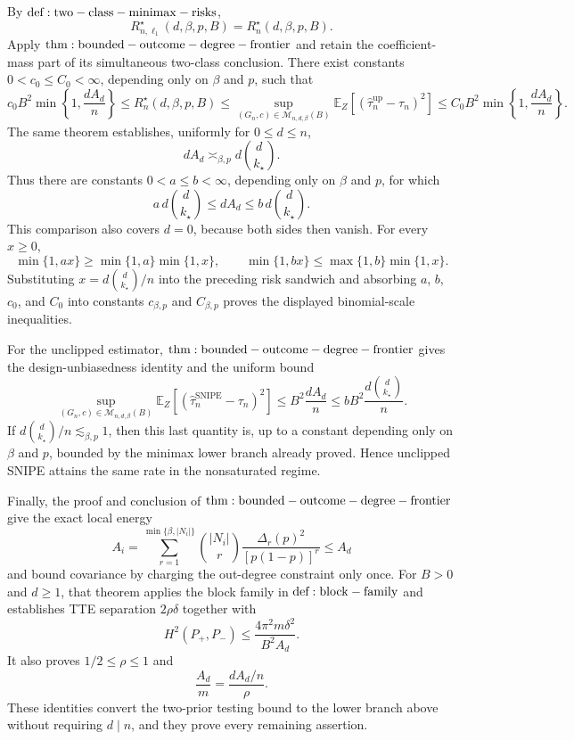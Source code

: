 By \({\rm def:two-class-minimax-risks}\),
\[
R_{n,\ell_1}^{\star}(d,\beta,p,B)=R_n^\star(d,\beta,p,B).
\]
Apply \({\rm thm:bounded-outcome-degree-frontier}\) and retain the coefficient-mass part of its simultaneous two-class conclusion. There exist constants \(0<c_0\le C_0<\infty\), depending only on \(\beta\) and \(p\), such that
\[
c_0B^2\min\!\left\{1,\frac{dA_d}{n}\right\}
\le R_n^\star(d,\beta,p,B)
\le \sup_{(G_n,c)\in\mathcal M_{n,d,\beta}(B)}
\mathbb E_Z\!\left[(\widehat\tau_n^{\mathrm{up}}-\tau_n)^2\right]
\le C_0B^2\min\!\left\{1,\frac{dA_d}{n}\right\}.
\]
The same theorem establishes, uniformly for \(0\le d\le n\),
\[
dA_d\asymp_{\beta,p}d\binom d{k_\star}.
\]
Thus there are constants \(0<a\le b<\infty\), depending only on \(\beta\) and \(p\), for which
\[
a\,d\binom d{k_\star}\le dA_d\le b\,d\binom d{k_\star}.
\]
This comparison also covers \(d=0\), because both sides then vanish. For every \(x\ge0\),
\[
\min\{1,ax\}\ge \min\{1,a\}\min\{1,x\},
\qquad
\min\{1,bx\}\le \max\{1,b\}\min\{1,x\}.
\]
Substituting \(x=d\binom d{k_\star}/n\) into the preceding risk sandwich and absorbing \(a\), \(b\), \(c_0\), and \(C_0\) into constants \(c_{\beta,p}\) and \(C_{\beta,p}\) proves the displayed binomial-scale inequalities.

For the unclipped estimator, \({\rm thm:bounded-outcome-degree-frontier}\) gives the design-unbiasedness identity and the uniform bound
\[
\sup_{(G_n,c)\in\mathcal M_{n,d,\beta}(B)}
\mathbb E_Z\!\left[(\widehat\tau_n^{\mathrm{SNIPE}}-\tau_n)^2\right]
\le B^2\frac{dA_d}{n}
\le bB^2\frac{d\binom d{k_\star}}{n}.
\]
If \(d\binom d{k_\star}/n\lesssim_{\beta,p}1\), then this last quantity is, up to a constant depending only on \(\beta\) and \(p\), bounded by the minimax lower branch already proved. Hence unclipped SNIPE attains the same rate in the nonsaturated regime.

Finally, the proof and conclusion of \({\rm thm:bounded-outcome-degree-frontier}\) give the exact local energy
\[
A_i=\sum_{r=1}^{\min\{\beta,|N_i|\}}\binom{|N_i|}{r}
\frac{\Delta_r(p)^2}{[p(1-p)]^r}\le A_d
\]
and bound covariance by charging the out-degree constraint only once. For \(B>0\) and \(d\ge1\), that theorem applies the block family in \({\rm def:block-family}\) and establishes TTE separation \(2\rho\delta\) together with
\[
H^2(P_+,P_-)\le \frac{4\pi^2m\delta^2}{B^2A_d}.
\]
It also proves \(1/2\le\rho\le1\) and
\[
\frac{A_d}{m}=\frac{dA_d/n}{\rho}.
\]
These identities convert the two-prior testing bound to the lower branch above without requiring \(d\mid n\), and they prove every remaining assertion.